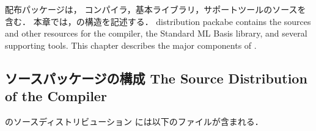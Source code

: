 \chapter{}
\label{chap:package}

\ifjp%
	\smlsharp{}配布パッケージは，
\smlsharp{}コンパイラ，基本ライブラリ，サポートツールのソースを含む．
	本章では，の構造を記述する．
\else%
	\smlsharp{} distribution packabe 
contains the sources and other resources for the \smlsharp{} compiler,
the Standard ML Basis library, and several supporting tools.
	This chapter describes the major components of
.
\fi%

\section{\txt
{\smlsharp{}ソースパッケージの構成}
{The Source Distribution of the \smlsharp{} Compiler}
}

\ifjp%
	\smlsharp{}のソースディストリビューション
には以下のファイルが含まれる．

